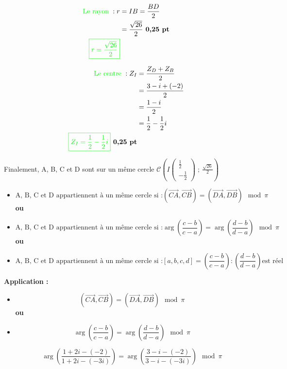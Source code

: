 \documentclass[12pt]{article}
\begin{document}
\begin{enumerate}
\begin{enumerate}
\begin{align*}
\text{\textcolor{green}{Le rayon }} : r&=IB=\frac{BD}{2}\\
&=\frac{\sqrt{26}}{2}\textbf{ 0,25 pt}\\
\textcolor{green}{\boxed{r=\frac{\sqrt{26}}{2}}}
\end{align*}

\begin{align*}
\text{\textcolor{green}{Le centre }} : Z_{I}&=\frac{Z_{D}+Z_{B}}{2}\\
&=\frac{3-i+(-2)}{2}\\
&=\frac{1-i}{2}\\
&=\frac{1}{2}-\frac{1}{2}i \\
\textcolor{green}{\boxed{Z_{I}=\frac{1}{2}-\frac{1}{2}i}}\textbf{ 0,25 pt}
\end{align*}

Finalement, A, B, C et D sont sur un même cercle $\mathcal{C}\left(I\begin{pmatrix} \frac{1}{2} \\ -\frac{1}{2}\end{pmatrix}\;;\ \frac{\sqrt{26}}{2}\right)$
\begin{itemize}
\item \[
\text{A, B, C et D appartiennent à un même cercle si :}\left({\overrightarrow {CA}},{\overrightarrow {CB}}\right)=\left({\overrightarrow {DA}},{\overrightarrow {DB}}\right)\mod \pi 
\]
\textbf{ou}
\item \[
\text{A, B, C et D appartiennent à un même cercle si :}\arg \left({\frac {c-b}{c-a}}\right)=\arg \left({\frac {d-b}{d-a}}\right)\mod \pi
\]
\textbf{ou}
\item \[
\text{A, B, C et D appartiennent à un même cercle si :}\left[ a,b,c,d \right] =\left({\frac {c-b}{c-a}}\right):\left({\frac {d-b}{d-a}}\right) \text{est réel}
\]
\end{itemize}
\begin{center}
\textbf{Application :}
\end{center}
\begin{itemize}
\item 
\[
\left({\overrightarrow {CA}},{\overrightarrow {CB}}\right)=\left({\overrightarrow {DA}},{\overrightarrow {DB}}\right)\mod \pi 
\]
\textbf{ou}
\item 
\[
\arg \left({\frac {c-b}{c-a}}\right)=\arg \left({\frac {d-b}{d-a}}\right)\mod \pi
\]

\[
\arg \left({\frac {1+2i-(-2)}{1+2i-(-3i)}}\right)=\arg \left({\frac {3-i-(-2)}{3-i-(-3i)}}\right)\mod \pi
\]


\end{itemize}
\end{enumerate}
\end{enumerate}
\end{document}
